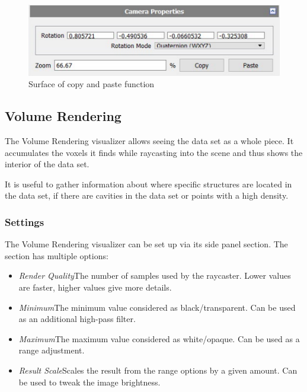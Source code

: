 \begin{figure}[h!]
  \centering
  \includegraphics[width=1.0\textwidth]{img/zoomCopyAndPaste.PNG}
  \caption{Surface of copy and paste function}
\end{figure}

\newpage
\subsection{Volume Rendering}

The Volume Rendering visualizer allows seeing the data set as a whole piece. It accumulates
the voxels it finds while raycasting into the scene and thus shows the interior of
the data set.

It is useful to gather information about where specific structures are located in
the data set, if there are cavities in the data set or points with a high density.

\subsubsection{Settings}
The Volume Rendering visualizer can be set up via its side panel section.
The section has multiple options:
\begin{itemize}
  \item{\emph{Render Quality}\newline The number of samples used by the raycaster.
    Lower values are faster, higher values give more details.}
  \item{\emph{Minimum}\newline The minimum value considered as black/transparent.
    Can be used as an additional high-pass filter.}  
  \item{\emph{Maximum}\newline The maximum value considered as white/opaque.
      Can be used as a range adjustment.}
  \item{\emph{Result Scale}\newline Scales the result from the range options by
    a given amount. Can be used to tweak the image brightness.}
\end{itemize}


